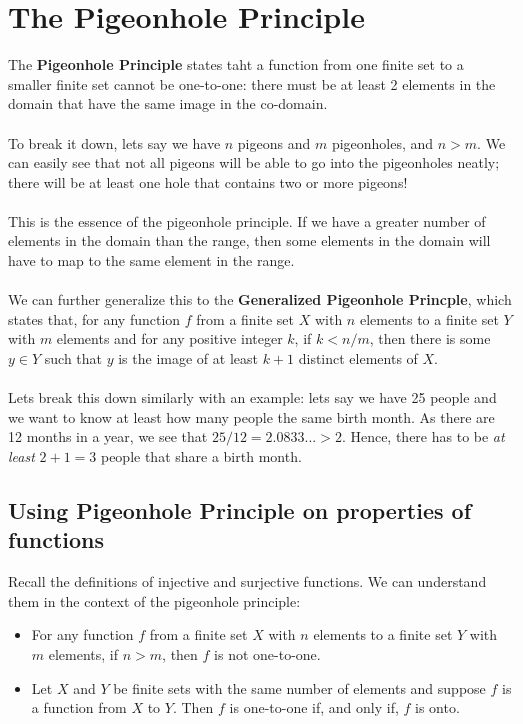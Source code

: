 \documentclass[a4paper]{article}
\begin{document}
\section{The Pigeonhole Principle}
The \textbf{Pigeonhole Principle} states taht a function from one finite set to a smaller finite set cannot be one-to-one: there must be at least 2 elements in the domain that have the same image in the co-domain.\\\\
To break it down, lets say we have $n$ pigeons and $m$ pigeonholes, and $n>m$. We can easily see that not all pigeons will be able to go into the pigeonholes neatly; there will be at least one hole that contains two or more pigeons!\\\\
This is the essence of the pigeonhole principle. If we have a greater number of elements in the domain than the range, then some elements in the domain will have to map to the same element in the range.\\\\
We can further generalize this to the \textbf{Generalized Pigeonhole Princple}, which states that, for any function $f$ from a finite set $X$ with $n$ elements to a finite set $Y$ with $m$ elements and for any positive integer $k$, if $k < n/m$, then there is some $y \in Y$ such that $y$ is the image of at least $k+1$ distinct elements of $X$.\\\\
Lets break this down similarly with an example: lets say we have 25 people and we want to know at least how many people the same birth month. As there are 12 months in a year, we see that $25/12 = 2.0833... > 2$. Hence, there has to be \textit{at least} $2+1 = 3$ people that share a birth month.

\subsection{Using Pigeonhole Principle on properties of functions}
Recall the definitions of injective and surjective functions. We can understand them in the context of the pigeonhole principle:
\begin{itemize}
	\item For any function $f$ from a finite set $X$ with $n$ elements to a finite set $Y$ with $m$ elements, if $n>m$, then $f$ is not one-to-one.
	\item Let $X$ and $Y$ be finite sets with the same number of elements and suppose $f$ is a function from $X$ to $Y$. Then $f$ is one-to-one if, and only if, $f$ is onto.
\end{itemize}
\end{document}
